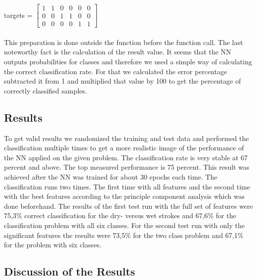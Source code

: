 \documentclass[subfigure,epsfig,fleqn,float,ausarbeitung]{scrartcl}
\begin{document}
~\\ ~\\
targets = 	$\begin{bmatrix}
1 & 1 & 0 & 0 & 0 & 0 \\
0 & 0 & 1 & 1 & 0 & 0\\
0 & 0 & 0 & 0 & 1 & 1
\end{bmatrix}$
~\\ ~\\

This preparation is done outside the function before the function call. The last noteworthy fact is the calculation of the result value. It seems that the NN outputs probabilities for classes and therefore we used a simple way of calculating the correct classification rate. For that we calculated the error percentage subtracted it from 1 and multiplied that value by 100 to get the percentage of correctly classified samples.

\subsection{Results}

To get valid results we randomized the training and test data and performed the classification multiple times to get a more realistic image of the performance of the NN applied on the given problem. The classification rate is very stable at 67 percent and above. The top measured performance is 75 percent. This result was achieved after the NN was trained for about 30 epochs each time. 
The classification runs two times. The first time with all features and the second time with the best features according to the principle component analysis which was done beforehand. The results of the first test run with the full set of features were 75,3\% correct classification for the dry- versus wet strokes and 67,6\% for the classification problem with all six classes. 
For the second test run with only the significant features the results were 73,5\% for the two class problem and 67,1\% for the problem with six classes.

\subsection{Discussion of the Results}
\end{document}
